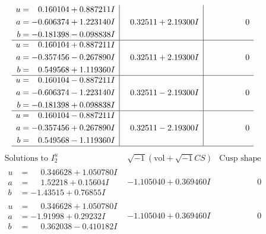 \documentclass[1p]{elsarticle_modified}
\theoremstyle{definition}
\newcommand{\I}{\sqrt{-1}}
\begin{document}
$$\begin{array}{c|c|c}
\begin{aligned}
u &= \phantom{-}0.160104 + 0.887211 I \\
a &= -0.606374 + 1.223140 I \\
b &= -0.181398 - 0.098838 I\end{aligned}
 & \phantom{-}0.32511 + 2.19300 I & \phantom{-0.000000 } 0 \\ \hline\begin{aligned}
u &= \phantom{-}0.160104 + 0.887211 I \\
a &= -0.357456 - 0.267890 I \\
b &= \phantom{-}0.549568 + 1.119360 I\end{aligned}
 & \phantom{-}0.32511 + 2.19300 I & \phantom{-0.000000 } 0 \\ \hline\begin{aligned}
u &= \phantom{-}0.160104 - 0.887211 I \\
a &= -0.606374 - 1.223140 I \\
b &= -0.181398 + 0.098838 I\end{aligned}
 & \phantom{-}0.32511 - 2.19300 I & \phantom{-0.000000 } 0 \\ \hline\begin{aligned}
u &= \phantom{-}0.160104 - 0.887211 I \\
a &= -0.357456 + 0.267890 I \\
b &= \phantom{-}0.549568 - 1.119360 I\end{aligned}
 & \phantom{-}0.32511 - 2.19300 I & \phantom{-0.000000 } 0\\
 \hline 
 \end{array}$$\newpage$$\begin{array}{c|c|c}  
\text{Solutions to }I^u_{2}& \I (\text{vol} + \sqrt{-1}CS) & \text{Cusp shape}\\
 \hline 
\begin{aligned}
u &= \phantom{-}0.346628 + 1.050780 I \\
a &= \phantom{-}1.52218 + 0.15604 I \\
b &= -1.43515 + 0.76855 I\end{aligned}
 & -1.105040 + 0.369460 I & \phantom{-0.000000 } 0 \\ \hline\begin{aligned}
u &= \phantom{-}0.346628 + 1.050780 I \\
a &= -1.91998 + 0.29232 I \\
b &= \phantom{-}0.362038 - 0.410182 I\end{aligned}
 & -1.105040 + 0.369460 I & \phantom{-0.000000 } 0 \\ \hline\begin{aligned}

\end{aligned}
\end{array}$$
\end{document}
